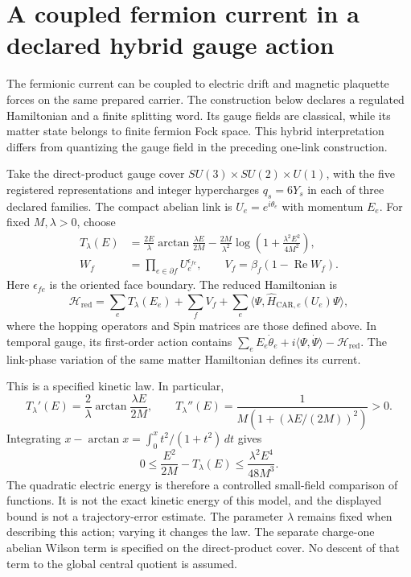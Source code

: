 \section{A coupled fermion current in a declared hybrid gauge action}
\label{app:fermion-coupled-action}

The fermionic current can be coupled to electric drift and magnetic
plaquette forces on the same prepared carrier. The construction below
declares a regulated Hamiltonian and a finite splitting word. Its gauge
fields are classical, while its matter state belongs to finite fermion
Fock space. This hybrid interpretation differs from quantizing the gauge
field in the preceding one-link construction.

Take the direct-product gauge cover
$SU(3)\times SU(2)\times U(1)$, with the five registered representations
and integer hypercharges $q_s=6Y_s$ in each of three declared families.
The compact abelian link is $U_e=e^{i\theta_e}$ with momentum $E_e$.
For fixed $M,\lambda>0$, choose
\begin{align}
 T_\lambda(E)&=\frac{2E}{\lambda}
       \arctan\frac{\lambda E}{2M}
       -\frac{2M}{\lambda^2}
       \log\left(1+\frac{\lambda^2E^2}{4M^2}\right),\\
 W_f&=\prod_{e\in\partial f}U_e^{\epsilon_{fe}},\qquad
 V_f=\beta_f(1-\operatorname{Re}W_f).
\end{align}
Here $\epsilon_{fe}$ is the oriented face boundary. The reduced Hamiltonian
is
\[
 \mathcal H_{\mathrm{red}}=
 \sum_e T_\lambda(E_e)+\sum_f V_f+
 \sum_e\langle\Psi,\widehat H_{\mathrm{CAR},e}(U_e)\Psi\rangle,
\]
where the hopping operators and Spin matrices are those defined above.
In temporal gauge, its first-order action contains
$\sum_e E_e\dot\theta_e+i\langle\Psi,\dot\Psi\rangle-
\mathcal H_{\mathrm{red}}$. The link-phase variation of the same matter
Hamiltonian defines its current.

This is a specified kinetic law. In particular,
\[
 T_\lambda'(E)=\frac{2}{\lambda}\arctan\frac{\lambda E}{2M},
 \qquad
 T_\lambda''(E)=\frac{1}{M(1+(\lambda E/(2M))^2)}>0.
\]
Integrating $x-\arctan x=\int_0^x t^2/(1+t^2)\,dt$ gives
\[
 0\leq\frac{E^2}{2M}-T_\lambda(E)
       \leq\frac{\lambda^2E^4}{48M^3}.
\]
The quadratic electric energy is therefore a controlled small-field
comparison of functions. It is not the exact kinetic energy of this model,
and the displayed bound is not a trajectory-error estimate. The parameter
$\lambda$ remains fixed when describing this action; varying it changes
the law. The separate charge-one abelian Wilson term is specified on the
direct-product cover. No descent of that term to the global central
quotient is assumed.

